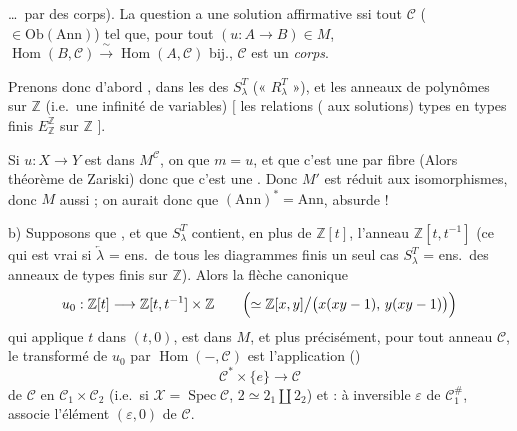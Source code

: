 \documentclass[11pt,a4paper]{article}
\begin{document}
\ldots\ par \ill{} \ill{} des corps). La question a une solution affirmative ssi
tout  $\mathcal{C}$ ($\in \mathrm{Ob}(\mathrm{Ann})$) tel que, pour
tout $(u : A \to B) \in M$, $\operatorname{Hom}(B, \mathcal{C}) \xrightarrow{\ \sim\ }
\operatorname{Hom}(A, \mathcal{C})$ bij., $\mathcal{C}$ est un \emph{corps}.

Prenons donc d'abord , dans les
\ill{} des $S^{T}_{\lambda}$ (« $R^{T}_{\lambda}$ »), et les anneaux de polynômes
sur $\mathbb{Z}$ (i.e.\ une infinité de variables) $\bigl[$  les
 relations (\ill{} aux solutions)  \ill{} types
en types finis $E^{\mathbb{Z}}_{\mathbb{Z}}$ sur $\mathbb{Z}$ $\bigr]$.

Si $u : X \to Y$ est dans $M^{\mathcal{C}}$, on  que
$m = u$, et que c'est une \ill{}  par fibre (Alors théorème de
Zariski) donc que c'est une \ill{} \struck{\ill{}} . Donc
$M'$ est réduit aux isomorphismes, donc $M$ aussi ; on aurait donc que
$(\mathrm{Ann})^{*} = \mathrm{Ann}$, absurde !

b) Supposons \struck{\ill{}} que \uncertain{$\lambda = (\underleftarrow{\Sigma}, \underrightarrow{\lambda} = \emptyset)$}, et que $S^{T}_{\lambda}$ contient, en
plus \struck{\ill{}} de $\mathbb{Z}[t]$, l'anneau $\mathbb{Z}[t,t^{-1}]$ (ce qui
est vrai si $\underleftarrow{\lambda}$ = ens.\ de tous les diagrammes finis
\ill{} un seul cas $S^{T}_{\lambda}$ = ens.\ des anneaux de types finis sur
$\mathbb{Z}$). Alors la flèche canonique
\[
u_{0} : \mathbb{Z}[t] \longrightarrow \mathbb{Z}[t,t^{-1}] \times \mathbb{Z}
\qquad \Bigl( \simeq \mathbb{Z}[x,y] \big/
\bigl(x(xy-1),\, y(xy-1)\bigr) \Bigr)
\]
qui applique $t$ dans $(t,0)$, est dans $M$, et plus précisément, pour tout
anneau $\mathcal{C}$, le transformé de $u_{0}$ par $\operatorname{Hom}(-,
\mathcal{C})$ est l'application () \struck{\ill{}} \ill{}
\[
\mathcal{C}^{*} \times \{e\} \longrightarrow \mathcal{C}
\]
de $\mathcal{C}$ en $\mathcal{C}_{1} \times \mathcal{C}_{2}$ (i.e.\ si
$\mathcal{X} = \operatorname{Spec} \mathcal{C}$, \ill{} $2 \simeq 2_{1} \amalg
2_{2}$) et : à  inversible $\varepsilon$ de
$\mathcal{C}_{1}^{\#}$, associe l'élément $(\varepsilon, 0)$ de $\mathcal{C}$.
\end{document}
